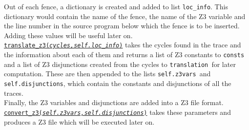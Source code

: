 \documentclass{article}
\newcommand{\var}[1]{\color{OliveGreen} \texttt{#1}\color{black}}
\newcommand{\fun}[2]{\color{Sepia}\texttt{#1(\color{Gray}\textit{#2}\color{Sepia})}\color{black}}
\begin{document}
Out of each fence, a dictionary is created and added to list \var{loc\_info}. This dictionary would contain the name of the fence, the name of the Z3 variable and the line number in the source program below which the fence is to be inserted. Adding these values will be useful later on.\\

\href{instructionsz3.tex}{\fun{translate\_z3}{cycles,self.loc\_info}} takes the cycles found in the trace and the information about each of them and returns a list of Z3 constants to \var{consts }and a list of Z3 disjunctions created from the cycles to \var{translation }for later computation. These are then appended to the lists \var{self.z3vars }and \var{self.disjunctions}, which contain the constants and disjunctions of all the traces.\\

Finally, the Z3 variables and disjunctions are added into a Z3 file format.\\
\href{stitchz3.tex}{\fun{convert\_z3}{self.z3vars,self.disjunctions}} takes these parameters and produces a Z3 file which will be executed later on.
\end{document}
